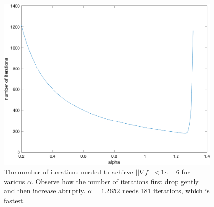 \documentclass{article}
\begin{document}
\begin{figure}[h]
	\centering
	\includegraphics[width=.7\linewidth]{figs/Q2_iteration_alpha.png}
	\caption{The number of iterations needed to achieve $ ||\nabla f||<1e-6 $ for various $ \alpha $. Observe how the number of iterations first drop gently and then increase abruptly. $ \alpha = 1.2652 $ needs 181 iterations, which is fastest. }
	\label{fig:Q2_iteration_alpha}
\end{figure}
\end{document}
